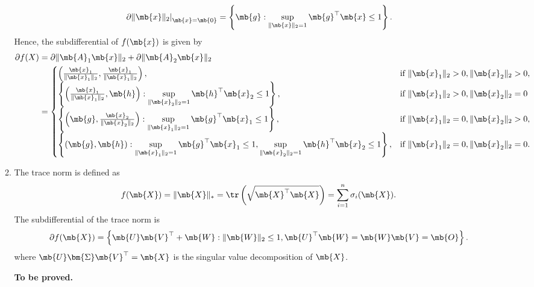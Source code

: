 \begin{exercise}[Subdifferentials]
\begin{enumerate}
\begin{solution}
\begin{enumerate}
$$              \left. \partial \|\mb{x}\|_2 \right|_{\mb{x}=\mb{0}} = \left\{\mb{g}:\sup_{\|\mb{x}\|_2 = 1}\mb{g}^\top\mb{x} \le 1\right\}.
            $$
            Hence, the subdifferential of $f(\mb{x})$ is given by 
            \begin{align*}
              \partial f(X) & = \partial \|\mb{A}_1\mb{x}\|_2 + \partial \|\mb{A}_2\mb{x}\|_2 \\
                            & = 
              \begin{cases}
                \left(\frac{\mb{x}_1}{\|\mb{x}_1\|_2}, \frac{\mb{x}_1}{\|\mb{x}_1\|_2}\right),                                                                     & \text{if } \|\mb{x}_1\|_2 > 0,\|\mb{x}_2\|_2 > 0,   \\
                \left\{\left(\frac{\mb{x}_1}{\|\mb{x}_1\|_2}, \mb{h}\right): \sup\limits_{\|\mb{x}_2\|_2 = 1}\mb{h}^\top\mb{x}_2 \le 1\right\},                        & \text{if } \|\mb{x}_1\|_2 > 0, \|\mb{x}_2\|_2 = 0   \\
                \left\{\left(\mb{g}, \frac{\mb{x}_2}{\|\mb{x}_2\|_2}\right): \sup\limits_{\|\mb{x}_1\|_2 = 1}\mb{g}^\top\mb{x}_1 \le 1\right\},                      & \text{if } \|\mb{x}_1\|_2 = 0, \|\mb{x}_2\|_2 > 0,  \\
                \left\{(\mb{g}, \mb{h}): \sup\limits_{\|\mb{x}_1\|_2 = 1}\mb{g}^\top\mb{x}_1 \le 1, \sup\limits_{\|\mb{x}_2\|_2 = 1}\mb{h}^\top\mb{x}_2 \le 1\right\}, & \text{if } \|\mb{x}_1\|_2 = 0, \|\mb{x}_2\|_2 = 0.
              \end{cases}
            \end{align*}
          \item The trace norm is defined as $$
              f(\mb{X}) = \|\mb{X}\|_* = \tr \left(\sqrt{\mb{X}^\top\mb{X}}\right) = \sum_{i=1}^n \sigma_i(\mb{X}).
            $$
            The subdifferential of the trace norm is
            $$
              \partial f(\mb{X}) = \left\{\mb{U}\mb{V}^\top + \mb{W} : \|\mb{W}\|_2 \le 1, \mb{U}^\top \mb{W} = \mb{W}\mb{V} = \mb{O}\right\}.
            $$
            where $\mb{U}\bm{\Sigma} \mb{V}^\top = \mb{X}$ is the singular value decomposition of $\mb{X}$.


            \textbf{To be proved.}
        \end{enumerate}
      \end{solution}
      
  \end{enumerate}
\end{exercise}
\newpage



